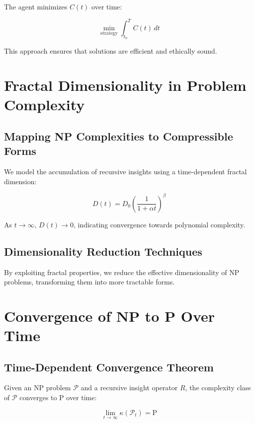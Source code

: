 \documentclass{article}
\begin{document}
The agent minimizes \( C(t) \) over time:

\begin{equation}
\min_{\text{strategy}} \int_{t_0}^{T} C(t) \, dt
\end{equation}

This approach ensures that solutions are efficient and ethically sound.

\section{Fractal Dimensionality in Problem Complexity}

\subsection{Mapping NP Complexities to Compressible Forms}

We model the accumulation of recursive insights using a time-dependent fractal dimension:

\begin{equation}
D(t) = D_0 \left( \frac{1}{1 + \alpha t} \right)^\beta
\end{equation}

As \( t \rightarrow \infty \), \( D(t) \rightarrow 0 \), indicating convergence towards polynomial complexity.

\subsection{Dimensionality Reduction Techniques}

By exploiting fractal properties, we reduce the effective dimensionality of NP problems, transforming them into more tractable forms.

\section{Convergence of NP to P Over Time}

\subsection{Time-Dependent Convergence Theorem}

\begin{theorem}
Given an NP problem \( \mathcal{P} \) and a recursive insight operator \( R \), the complexity class of \( \mathcal{P} \) converges to P over time:

\[
\lim_{t \rightarrow \infty} \kappa(\mathcal{P}_t) = \text{P}
\]
\end{theorem}
\end{document}
